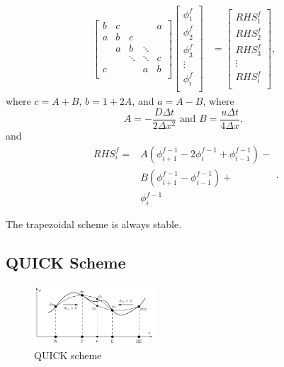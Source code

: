 \documentclass[twocolumn,10pt]{asme2ej}
\begin{document}
\begin{equation}
\begin{split}
\begin{bmatrix}
   { b } & { c } & {   }  & {   }  & { a } \\
   { a } & { b } & { c }  & {   }  & {   } \\
   {   } & { a } & { b }  & \ddots & {   } \\
   {   } & {   } & \ddots & \ddots & { c }\\
   { c } & {   } & {   }  &  { a }  & { b }\\
\end{bmatrix}
\begin{bmatrix}
   {\phi_1^{f} }  \\
   {\phi_2^{f} }  \\
   {\phi_3^{f} }  \\
   \vdots   \\
   {\phi_{i}^{f} }  \\
\end{bmatrix}
& =
\begin{bmatrix}
   {RHS_1^{f} }  \\
   {RHS_2^{f} }  \\
   {RHS_3^{f} }  \\
   \vdots   \\
   {RHS_{i}^{f} }  \\
\end{bmatrix},
\end{split}
\end{equation}
where $c = A + B$, $b = 1 + 2 A $, and $a = A - B$, where
\begin{equation}
A = -\frac{D \Delta t }{2 \Delta x^2} \mbox{ and } B = \frac{u \Delta t }{4 \Delta x},
\end{equation}
and
\begin{equation}
\begin{split}
RHS_i^f = & A (\phi_{i+1}^{f-1} - 2 \phi_i^{f-1} + \phi_{i-1}^{f-1}) - \\
        & B (\phi_{i+1}^{f-1} - \phi_{i-1}^{f-1}) + \\
        & \phi_i^{f-1}
\end{split}.
\end{equation}

The trapezoidal scheme is always stable.

\subsection{QUICK Scheme}
\begin{figure}[thb]
\begin{center}
\includegraphics[width=0.4\textwidth]{figure/QUICK.png}
\caption{QUICK scheme}
\label{QUICK_scheme}
\end{center}
\end{figure}
\end{document}
